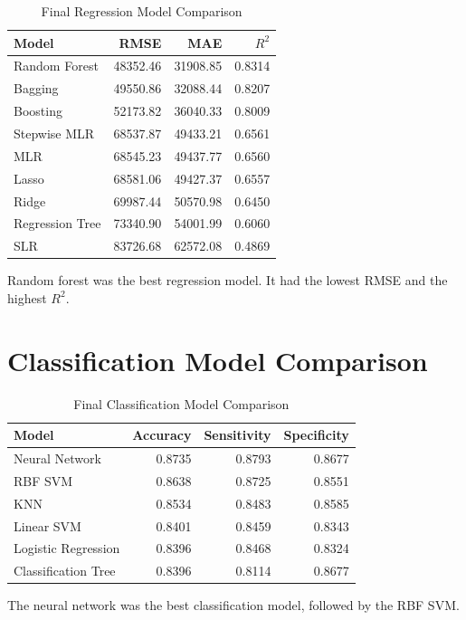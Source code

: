 \documentclass[12pt]{report}
\begin{document}
\begin{table}[H]
\centering
\caption{Final Regression Model Comparison}
\begin{tabular}{lrrr}
\toprule
Model & RMSE & MAE & $R^2$ \\
\midrule
Random Forest & 48352.46 & 31908.85 & 0.8314 \\
Bagging & 49550.86 & 32088.44 & 0.8207 \\
Boosting & 52173.82 & 36040.33 & 0.8009 \\
Stepwise MLR & 68537.87 & 49433.21 & 0.6561 \\
MLR & 68545.23 & 49437.77 & 0.6560 \\
Lasso & 68581.06 & 49427.37 & 0.6557 \\
Ridge & 69987.44 & 50570.98 & 0.6450 \\
Regression Tree & 73340.90 & 54001.99 & 0.6060 \\
SLR & 83726.68 & 62572.08 & 0.4869 \\
\bottomrule
\end{tabular}
\end{table}

Random forest was the best regression model. It had the lowest RMSE and the highest $R^2$.

\section{Classification Model Comparison}

\begin{table}[H]
\centering
\caption{Final Classification Model Comparison}
\begin{tabular}{lrrr}
\toprule
Model & Accuracy & Sensitivity & Specificity \\
\midrule
Neural Network & 0.8735 & 0.8793 & 0.8677 \\
RBF SVM & 0.8638 & 0.8725 & 0.8551 \\
KNN & 0.8534 & 0.8483 & 0.8585 \\
Linear SVM & 0.8401 & 0.8459 & 0.8343 \\
Logistic Regression & 0.8396 & 0.8468 & 0.8324 \\
Classification Tree & 0.8396 & 0.8114 & 0.8677 \\
\bottomrule
\end{tabular}
\end{table}

The neural network was the best classification model, followed by the RBF SVM.
\end{document}
